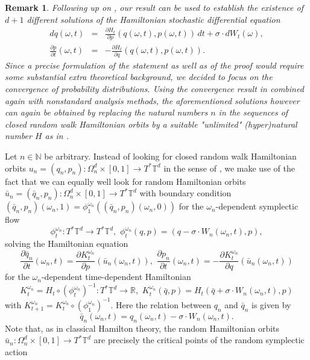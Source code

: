\documentclass[a4paper,11pt]{amsart}
\newcommand{\NN}{\mathbb{N}}
\newcommand{\RR}{\mathbb{R}}
\newcommand{\TT}{\mathbb{T}}
\newtheorem{remark}[theorem]{Remark}
\begin{document}
\begin{remark}
Following up on , our result can be used to establish the existence of $d+1$ different solutions of the Hamiltonian \emph{stochastic differential equation} 
\begin{eqnarray*}
 dq(\omega,t)&=&\frac{\partial H_t}{\partial p}(q(\omega,t),p(\omega,t))\,dt + \sigma\cdot dW_t(\omega),\\ \frac{\partial p}{\partial t}(\omega,t)&=&-\frac{\partial H_t}{\partial q}(q(\omega,t),p(\omega,t)).
 \end{eqnarray*}
Since a precise formulation of the statement as well as of the proof would require some substantial extra theoretical background, we decided to focus on the convergence of probability distributions. Using the convergence result in  combined again with nonstandard analysis methods, the aforementioned solutions however can again be obtained by replacing the natural numbers $n$ in the sequences of closed random walk Hamiltonian orbits by a suitable "unlimited" (hyper)natural number $H$ as in .
\end{remark}
\indent Let $n\in\NN$ be arbitrary. Instead of looking for closed random walk Hamiltonian orbits $u_n=(q_n,p_n):\Omega_n^d\times [0,1]\to T^*\TT^d$ in the sense of , we make use of the fact that we can equally well look for random Hamiltonian orbits  $\bar{u}_n=(\bar{q}_n,p_n):\Omega_n^d\times [0,1]\to T^*\TT^d$ with boundary condition $(\bar{q}_n,p_n)(\omega_n,1)=\phi^{\omega_n}_1( (\bar{q}_n,p_n)(\omega_n,0))$ for the $\omega_n$-dependent symplectic flow \[\phi^{\omega_n}_t: T^*\TT^d\to T^*\TT^d,\,\,\phi^{\omega_n}_t(q,p)=(q-\sigma\cdot W_n(\omega_n,t),p),\] solving the Hamiltonian equation 
\begin{equation}\label{G-eq} \frac{\partial\bar{q}_n}{\partial t}(\omega_n,t)=\frac{\partial K^{\omega_n}_t}{\partial p}(\bar{u}_n(\omega_n,t)),\,\,\frac{\partial p_n}{\partial t}(\omega_n,t)=-\frac{\partial K^{\omega_n}_t}{\partial q}(\bar{u}_n(\omega_n,t))\end{equation} for the $\omega_n$-dependent time-dependent Hamiltonian \[K^{\omega_n}_t=H_t\circ(\phi^{\omega_n}_t)^{-1}:T^*\TT^d\to\RR,\,\, K^{\omega_n}_t(\bar{q},p)=H_t(\bar{q}+\sigma\cdot W_n(\omega_n,t),p)\] with $K^{\omega_n}_{t+1}=K^{\omega_n}_t\circ(\phi^{\omega_n}_1)^{-1}$. Here the relation between $q_n$ and $\bar{q}_n$ is given by \[\bar{q}_n(\omega_n,t)=q_n(\omega_n,t)-\sigma\cdot W_n(\omega_n,t).\] Note that, as in classical Hamilton theory, the random Hamiltonian orbits $\bar{u}_n:\Omega_n^d\times [0,1]\to T^*\TT^d$ are precisely the critical points of the random symplectic action 
\end{document}
